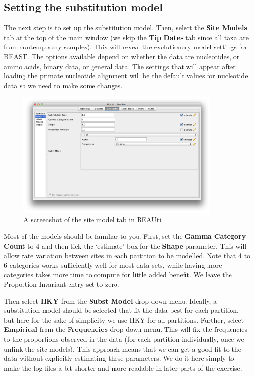 \documentclass[11pt]{article}
\theoremstyle{plain}%
\theoremstyle{definition}
\theoremstyle{remark}
\begin{document}
\subsection{Setting the substitution model}

The next step is to set up the substitution model. 
Then, select the {\bf Site Models} tab at the top of the main window (we skip the {\bf Tip Dates} tab since all taxa are from contemporary
samples). This will reveal the evolutionary model settings for BEAST. The options available depend on whether the data are nucleotides, or amino acids, binary data, or general data. The settings that will appear after loading the primate nucleotide alignment will be the default values for nucleotide data so we need to make some changes. 

\begin{figure}
\centering	
\includegraphics[width=0.9\textwidth]{figures/BEAUti_Model}
\caption{A screenshot of the site model tab in BEAUti.}
\label{fig:BEAUti_Model}
\end{figure}

Most of the models should be familiar to you. %
First, set the \textbf{Gamma Category Count} to 4 and then tick the `estimate' box for the \textbf{Shape} parameter. This will allow rate variation 
between sites in each partition to be modelled.  Note that 4 to 6 categories works sufficiently well for most data
sets, while having more categories takes more time to compute for little added benefit. We leave the Proportion Invariant entry set to zero.

Then select  \textbf{HKY} from the \textbf{Subst Model} drop-down menu. Ideally, a substitution model should be selected that fit the data best for each partition, but here for the sake of simplicity we use HKY for all partitions. Further, select \textbf{Empirical} from the \textbf{Frequencies} drop-down menu. This will fix the frequencies to the proportions observed in the data (for each partition individually, once we unlink the site models). This approach means that we can get a good fit to the data without explicitly estimating these parameters. We do it here simply to make the log files a bit shorter and more readable in later parts of the exercise. 
\end{document}
